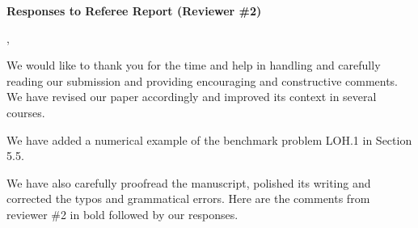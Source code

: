 \documentclass[twoside,11pt]{article}
\begin{document}
\begin{center}
{\Large \textbf{Responses to Referee Report (Reviewer \#2)}}
\end{center}

,

We would like to thank you for the time and help in handling and carefully reading our submission and providing encouraging and constructive comments.  We have revised our paper accordingly and improved its context in several courses. 

We have added a numerical example of the benchmark problem LOH.1 in Section 5.5.

We have also carefully proofread the manuscript, polished its writing and corrected the typos and grammatical errors.  Here are the comments from reviewer \#2 in bold followed by our responses.
\end{document}
